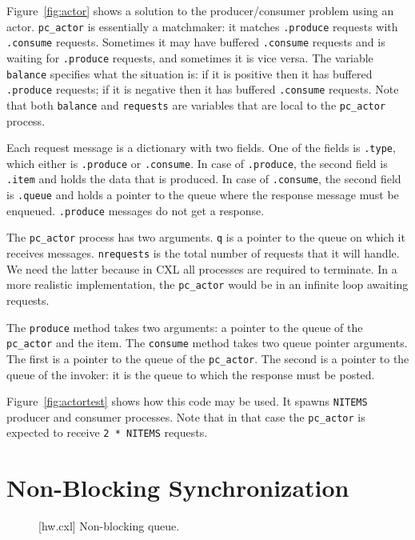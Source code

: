 \documentclass{report}
\newenvironment{code}{
\tcolorbox
}{
\endtcolorbox
}
\begin{document}
Figure~\ref{fig:actor} shows a solution to the producer/consumer problem using
an actor.  \texttt{pc\_actor} is essentially a matchmaker: it matches
\texttt{.produce} requests with \texttt{.consume} requests.
Sometimes it may have buffered \texttt{.consume} requests and is waiting for
\texttt{.produce} requests, and sometimes it is vice versa.
The variable \texttt{balance} specifies what the situation is: if it is positive
then it has buffered \texttt{.produce} requests;
if it is negative
then it has buffered \texttt{.consume} requests.
Note that both \texttt{balance} and \texttt{requests} are variables that are
local to the \texttt{pc\_actor} process.

Each request message is a dictionary with two fields.  One of the fields is
\texttt{.type}, which either is \texttt{.produce} or \texttt{.consume}.
In case of \texttt{.produce}, the second field is \texttt{.item} and holds
the data that is produced.
In case of \texttt{.consume}, the second field is \texttt{.queue} and holds
a pointer to the queue where the response message must be enqueued.
\texttt{.produce} messages do not get a response.

The \texttt{pc\_actor} process has two arguments.  \texttt{q} is a pointer
to the queue on which it receives messages.  \texttt{nrequests} is the total
number of requests that it will handle.  We need the latter because in CXL
all processes are required to terminate.  In a more realistic implementation,
the \texttt{pc\_actor} would be in an infinite loop awaiting requests.

The \texttt{produce} method takes two arguments: a pointer to the queue
of the \texttt{pc\_actor} and the item.  The \texttt{consume} method
takes two queue pointer arguments.  The first is a pointer to the queue
of the \texttt{pc\_actor}.  The second is a pointer to the queue of the
invoker: it is the queue to which the response must be posted.

Figure~\ref{fig:actortest} shows how this code may be used.  It spawns
\texttt{NITEMS} producer and consumer processes.  Note that in that
case the \texttt{pc\_actor} is expected to receive \texttt{2 * NITEMS}
requests.

\chapter{Non-Blocking Synchronization}
\label{ch:nonblocking}

\begin{figure}
\begin{code}
\end{code}
\caption{[hw.cxl] Non-blocking queue.}
\label{fig:hw}
\end{figure}
\end{document}
